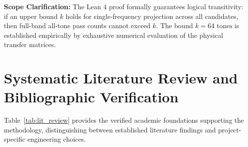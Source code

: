 \documentclass[11pt,a4paper,titlepage]{article}
\begin{document}
\noindent \textbf{Scope Clarification:} The Lean 4 proof formally guarantees logical transitivity: if an upper bound $k$ holds for single-frequency projection across all candidates, then full-band all-tone pass counts cannot exceed $k$. The bound $k = 64\text{ tones}$ is established empirically by exhaustive numerical evaluation of the physical transfer matrices.

\newpage

\section{Systematic Literature Review and Bibliographic Verification}
\label{app:lit_review}

Table~\ref{tab:lit_review} provides the verified academic foundations supporting the methodology, distinguishing between established literature findings and project-specific engineering choices.
\end{document}
